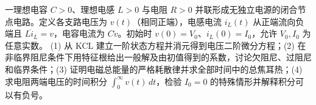 一理想电容 \(C>0\)、理想电感 \(L>0\) 与电阻 \(R>0\) 并联形成无独立电源的闭合节点电路。定义各支路电压为 \(v(t)\)（相同正端），电感电流 \(i_L(t)\) 从正端流向负端且 \(L\dot i_L=v\)，电容电流为 \(C\dot v\)。初始时 \(v(0)=V_0\)、\(i_L(0)=I_0\)，允许 \(V_0,I_0\) 为任意实数。
(1) 从 KCL 建立一阶状态方程并消元得到电压二阶微分方程；(2) 在非临界阻尼条件下用特征根给出一般解及由初值得到的系数，讨论欠阻尼、过阻尼和临界条件；(3) 证明电磁总能量的严格耗散律并求全部时间中的总焦耳热；(4) 求电阻两端电压的时间积分 \(\int_0^\infty v(t)\,dt\)，检验 \(I_0=0\) 的特殊情形并解释积分可以有负号。
